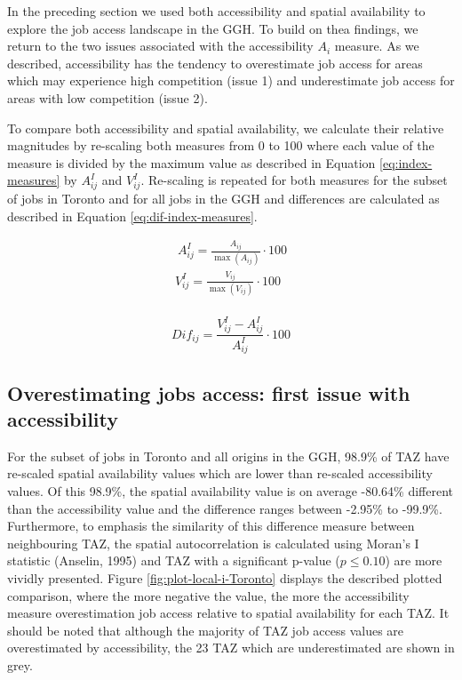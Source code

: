 \documentclass[]{elsarticle} %
\begin{document}
In the preceding section we used both accessibility and spatial
availability to explore the job access landscape in the GGH. To build on
thea findings, we return to the two issues associated with the
accessibility \(A_i\) measure. As we described, accessibility has the
tendency to overestimate job access for areas which may experience high
competition (issue 1) and underestimate job access for areas with low
competition (issue 2).

To compare both accessibility and spatial availability, we calculate
their relative magnitudes by re-scaling both measures from 0 to 100
where each value of the measure is divided by the maximum value as
described in Equation \ref{eq:index-measures} by \(A^I_{ij}\) and
\(V^I_{ij}\). Re-scaling is repeated for both measures for the subset of
jobs in Toronto and for all jobs in the GGH and differences are
calculated as described in Equation \ref{eq:dif-index-measures}.

\begin{equation}
\label{eq:index-measures}
\begin{array}{l}\
A^I_{ij} = \frac{A_{ij}}{\max(A_{ij})}\cdot100\\
V^I_{ij} = \frac{V_{ij}}{\max(V_{ij})}\cdot100\\
\end{array}
\end{equation}

\begin{equation}
\label{eq:dif-index-measures}
Dif_{ij} = \frac{V^I_{ij} - A^I_{ij}}{A^I_{ij}}\cdot100
\end{equation}

\hypertarget{overestimating-jobs-access-first-issue-with-accessibility}{%
\subsection{Overestimating jobs access: first issue with
accessibility}\label{overestimating-jobs-access-first-issue-with-accessibility}}

For the subset of jobs in Toronto and all origins in the GGH, 98.9\% of
TAZ have re-scaled spatial availability values which are lower than
re-scaled accessibility values. Of this 98.9\%, the spatial availability
value is on average -80.64\% different than the accessibility value and
the difference ranges between -2.95\% to -99.9\%. Furthermore, to
emphasis the similarity of this difference measure between neighbouring
TAZ, the spatial autocorrelation is calculated using Moran's I statistic
(Anselin, 1995) and TAZ with a significant p-value (\(p\le 0.10\)) are
more vividly presented. Figure \ref{fig:plot-local-i-Toronto} displays
the described plotted comparison, where the more negative the value, the
more the accessibility measure overestimation job access relative to
spatial availability for each TAZ. It should be noted that although the
majority of TAZ job access values are overestimated by accessibility,
the 23 TAZ which are underestimated are shown in grey.
\end{document}
